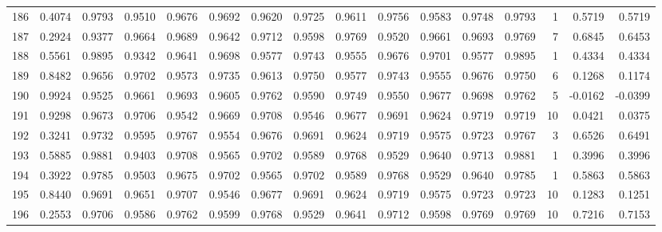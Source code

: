 \begin{tabular}{lrrrrrrrrrrrrrrr}
186 &      0.4074 &  0.9793 &  0.9510 &  0.9676 &  0.9692 &  0.9620 &  0.9725 &  0.9611 &  0.9756 &  0.9583 &   0.9748 &     0.9793 &      1 &                    0.5719 &                     0.5719 \\
187 &      0.2924 &  0.9377 &  0.9664 &  0.9689 &  0.9642 &  0.9712 &  0.9598 &  0.9769 &  0.9520 &  0.9661 &   0.9693 &     0.9769 &      7 &                    0.6845 &                     0.6453 \\
188 &      0.5561 &  0.9895 &  0.9342 &  0.9641 &  0.9698 &  0.9577 &  0.9743 &  0.9555 &  0.9676 &  0.9701 &   0.9577 &     0.9895 &      1 &                    0.4334 &                     0.4334 \\
189 &      0.8482 &  0.9656 &  0.9702 &  0.9573 &  0.9735 &  0.9613 &  0.9750 &  0.9577 &  0.9743 &  0.9555 &   0.9676 &     0.9750 &      6 &                    0.1268 &                     0.1174 \\
190 &      0.9924 &  0.9525 &  0.9661 &  0.9693 &  0.9605 &  0.9762 &  0.9590 &  0.9749 &  0.9550 &  0.9677 &   0.9698 &     0.9762 &      5 &                   -0.0162 &                    -0.0399 \\
191 &      0.9298 &  0.9673 &  0.9706 &  0.9542 &  0.9669 &  0.9708 &  0.9546 &  0.9677 &  0.9691 &  0.9624 &   0.9719 &     0.9719 &     10 &                    0.0421 &                     0.0375 \\
192 &      0.3241 &  0.9732 &  0.9595 &  0.9767 &  0.9554 &  0.9676 &  0.9691 &  0.9624 &  0.9719 &  0.9575 &   0.9723 &     0.9767 &      3 &                    0.6526 &                     0.6491 \\
193 &      0.5885 &  0.9881 &  0.9403 &  0.9708 &  0.9565 &  0.9702 &  0.9589 &  0.9768 &  0.9529 &  0.9640 &   0.9713 &     0.9881 &      1 &                    0.3996 &                     0.3996 \\
194 &      0.3922 &  0.9785 &  0.9503 &  0.9675 &  0.9702 &  0.9565 &  0.9702 &  0.9589 &  0.9768 &  0.9529 &   0.9640 &     0.9785 &      1 &                    0.5863 &                     0.5863 \\
195 &      0.8440 &  0.9691 &  0.9651 &  0.9707 &  0.9546 &  0.9677 &  0.9691 &  0.9624 &  0.9719 &  0.9575 &   0.9723 &     0.9723 &     10 &                    0.1283 &                     0.1251 \\
196 &      0.2553 &  0.9706 &  0.9586 &  0.9762 &  0.9599 &  0.9768 &  0.9529 &  0.9641 &  0.9712 &  0.9598 &   0.9769 &     0.9769 &     10 &                    0.7216 &                     0.7153 \\

\end{tabular}

